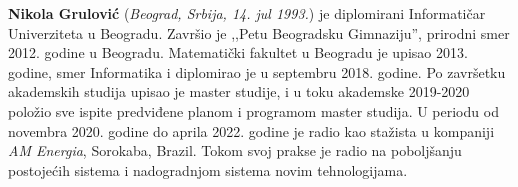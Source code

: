 \documentclass[12pt,oneside]{memoir}
\begin{document}
\begin{biografija}
  \textbf{Nikola Grulović} (\emph{Beograd, Srbija,
    14. jul 1993.}) je diplomirani Informatičar Univerziteta u Beogradu. Završio je ,,Petu Beogradsku Gimnaziju'', prirodni smer 2012. godine u Beogradu. Matematički fakultet u Beogradu je upisao 2013. godine, smer Informatika i diplomirao je u septembru 2018. godine. Po završetku akademskih studija upisao je master studije, i u toku akademske 2019-2020 položio sve ispite predviđene planom i programom master studija. U periodu od novembra 2020. godine do aprila 2022. godine je radio kao stažista u kompaniji \textit{AM Energia}, Sorokaba, Brazil. Tokom svoj prakse je radio na poboljšanju postojećih sistema i nadogradnjom sistema novim tehnologijama.
\end{biografija}
\end{document}
